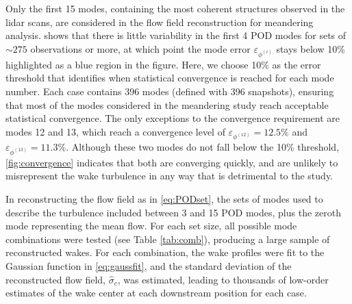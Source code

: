 \documentclass[aip,amsmath,amssymb,preprint,]{revtex4-1}
\begin{document}

Only the first 15 modes, containing the most coherent structures observed in the lidar scans, are considered in the flow field reconstruction for meandering analysis.  shows that there is little variability in the first 4 POD modes for sets of $\sim275$ observations or more, at which point the mode error $\varepsilon_{\phi^{(i)}}$ stays below 10\% highlighted as a blue region in the figure.
Here, we choose 10\% as the error threshold that identifies when statistical convergence is reached for each mode number.
Each case contains 396 modes (defined with 396 snapshots), ensuring that most of the modes considered in the meandering study reach acceptable statistical convergence.
The only exceptions to the convergence requirement are modes 12 and 13, which reach a convergence level of $\varepsilon_{\phi^{(12)}}=12.5\%$ and $\varepsilon_{\phi^{(13)}}=11.3\%$.
Although these two modes do not fall below the 10\% threshold, \cref{fig:convergence} indicates that both are converging quickly, and are unlikely to misrepresent the wake turbulence in any way that is detrimental to the study.

In reconstructing the flow field as in \cref{eq:PODset}, the sets of modes used to describe the turbulence included between 3 and 15 POD modes, plus the zeroth mode representing the mean flow.
For each set size, all possible mode combinations were tested (see Table \ref{tab:comb}), producing a large sample of reconstructed wakes.
For each combination, the wake profiles were fit to the Gaussian function in \cref{eq:gaussfit}, and the standard deviation of the reconstructed flow field, $\hat{\sigma}_c$, was estimated, leading to thousands of low-order estimates of the wake center at each downstream position for each case.
\end{document}
